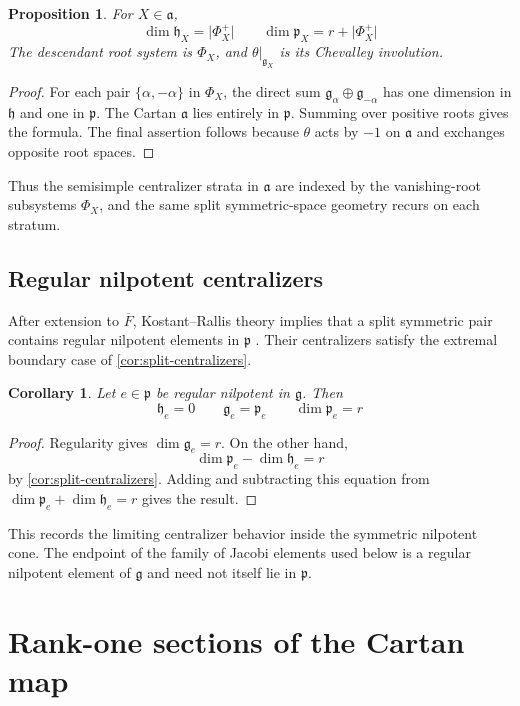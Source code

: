 \documentclass[11pt]{amsart}
\newtheorem{proposition}[proposition]{Proposition}
\newtheorem{corollary}[corollary]{Corollary}
\theoremstyle{definition}
\theoremstyle{remark}
\newcommand{\Fb}{\overline F}
\newcommand{\abs}[1]{\lvert #1\rvert}
\newcommand{\g}{\mathfrak g}
\newcommand{\h}{\mathfrak h}
\newcommand{\p}{\mathfrak p}
\newcommand{\aA}{\mathfrak a}
\begin{document}
\begin{proposition}\label{prop:root-centralizer-dimensions}
For $X\in\aA$,
\[
 \dim\h_X=\abs{\Phi_X^+}
 \qquad
 \dim\p_X=r+\abs{\Phi_X^+}
\]
The descendant root system is $\Phi_X$, and $\theta|_{\g_X}$ is its Chevalley
involution.
\end{proposition}

\begin{proof}
For each pair $\{\alpha,-\alpha\}$ in $\Phi_X$, the direct sum
$\g_\alpha\oplus\g_{-\alpha}$ has one dimension in $\h$ and one in $\p$.
The Cartan $\aA$ lies entirely in $\p$.  Summing over positive roots gives the
formula.  The final assertion follows because $\theta$ acts by $-1$ on
$\aA$ and exchanges opposite root spaces.
\end{proof}

Thus the semisimple centralizer strata in $\mathfrak{a}$ are indexed by the
vanishing-root subsystems $\Phi_X$, and the same split symmetric-space
geometry recurs on each stratum.

\subsection{Regular nilpotent centralizers}
After extension to $\Fb$, Kostant--Rallis theory implies that a
split symmetric pair contains regular nilpotent elements in $\p$
\cite{KostantRallis}.  Their centralizers satisfy the extremal boundary case of
\cref{cor:split-centralizers}.

\begin{corollary}\label{cor:regular-nilpotent-centralizer}
Let $e\in\p$ be regular nilpotent in $\g$.  Then
\[
 \h_e=0
 \qquad
 \g_e=\p_e
 \qquad
 \dim\p_e=r
\]
\end{corollary}

\begin{proof}
Regularity gives $\dim\g_e=r$.  On the other hand,
\[
 \dim\p_e-\dim\h_e=r
\]
by \cref{cor:split-centralizers}.  Adding and subtracting this equation from
$\dim\p_e+\dim\h_e=r$ gives the result.
\end{proof}

This records the limiting centralizer behavior inside the symmetric nilpotent
cone.  The endpoint of the family of Jacobi elements used below is a regular nilpotent element of $\g$
and need not itself lie in $\p$.

\section{Rank-one sections of the Cartan map}
\end{document}
